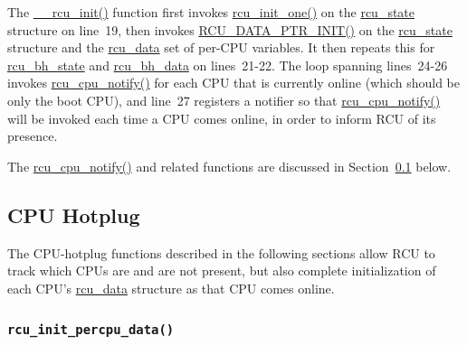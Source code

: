  \QuickQuizEnd

The \url{__rcu_init()} function first invokes \url{rcu_init_one()}
on the \url{rcu_state} structure on line~19, then invokes
\url{RCU_DATA_PTR_INIT()} on the \url{rcu_state} structure and
the \url{rcu_data} set of per-CPU variables.
It then repeats this for \url{rcu_bh_state} and \url{rcu_bh_data}
on lines~21-22.
The loop spanning lines~24-26 invokes \url{rcu_cpu_notify()} for
each CPU that is currently online (which should be only the boot
CPU), and line~27 registers a notifier so that \url{rcu_cpu_notify()}
will be invoked each time a CPU comes online, in order to inform
RCU of its presence.

 \QuickQuizEnd

The \url{rcu_cpu_notify()} and related functions are discussed in
Section~\ref{app:rcuimpl:rcutreewt:CPU Hotplug}
below.

\subsection{CPU Hotplug}
\label{app:rcuimpl:rcutreewt:CPU Hotplug}

The CPU-hotplug functions described in the following sections
allow RCU to track which CPUs are and are not present, but also
complete initialization of each CPU's \url{rcu_data} structure
as that CPU comes online.

\subsubsection{\tt rcu\_init\_percpu\_data()}
\label{app:rcuimpl:rcutreewt:rcu-init-percpu-data}

